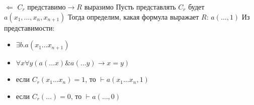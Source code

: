 $\Leftarrow$ $C_r \text{ представимо} \to R \text{ выразимо}$
Пусть представлять $C_r$ будет
$a(x_1, \dotsc, x_n,x_{n+1})$
Тогда определим, какая формула выражает $R$:
$a(\dotsc, 1)$
Из представимости:
\begin{itemize}
\item $\exists b.a(x_1\ldots{}x_{n+1})$
\item $\forall x\forall y(a(\ldots{}x) \& a(\ldots{} y) \to x = y)$
\item если $C_r(x_1\ldots{}x_n) = 1$, то $\vdash a(x_1\ldots{}x_n,1)$
\item если $C_r(\dots) = 0$, то $\vdash a(\dotsc, 0)$
\end{itemize}
\begin{comment}

Докажем выводимость
\begin{enumerate}
\item Покажем, что если $R(x_1\ldots{}x_n)$, то $\vdash a(x_1\ldots{}x_n, 1)$
Из представимости прямо ровно.
\item Покажем, что если $\lnot R(x_1\ldots{}.x_n), то \vdash \lnot a(x_1\ldots{}x_n, 1)$
по единственности

\forall x\forall y(a(x_1\ldots{}x_n, x) \& a(x_1\ldots{}x_n, y) \to x = y)
a(x_1\ldots{}x_n, 0) \& a(x_1\ldots{}x_n, 1) \to (0 = 1) (спустя две акс. и 2 MP)
дедукцию
$a(x_1\ldots{}x_n, 0) \& a(x_1\ldots{}x_n, 1) \vdash ⊥$
$a(x_1\ldots{}x_n, 0) \& a(x_1\ldots{}x_n, 1) \to a(x_1\ldots{}x_n, 0)$
$a(x_1\ldots{}x_n, 0)$
\lnot a(x_1\ldots{}x_n, 0)                          по представимости
a(x_1\ldots{}x_n, 0) \to (\lnot a(x_1\ldots{}x_n, 0) \to \lnot a(x_1\ldots{}x_n, 1)) (10i в ИИВ, доказуема в предикатах)
\lnot a(x_1\ldots{}x_n, 1)
хотим \lnot a(x_1\ldots{}x_n, 1)
\end{enumerate}
\subsection{beta-функция Гёделя, китайская теорема об остатках}
\label{sec-11-3}
β(b,c,i) = b \% (1 + c(1 + i)),
где \%(a, b) = d, \forall m.(d + m * b = a), m≥0, 0≤d≤b
\subsubsection{Китайская теорема об остатках}
\label{sec-11-3-1}
n_1\ldots{}nₖ - попарно взаимно простые инты
r_1\ldots{}rₖ - любые целые, что 0 ≤ rᵢ < nᵢ
\forall i\exists b  rᵢ = b \% nₖ

\end{comment}
